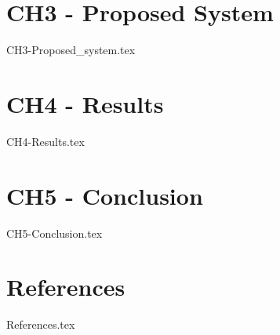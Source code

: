 \documentclass[a4paper]{book}
\begin{document}
	\chapter{CH3 - Proposed System}
	{CH3-Proposed_system.tex}
	
	\chapter{CH4 - Results}
	{CH4-Results.tex}
	
	\chapter{CH5 - Conclusion}
	{CH5-Conclusion.tex}
	
	\chapter{References}
	{References.tex}
	
\end{document}
